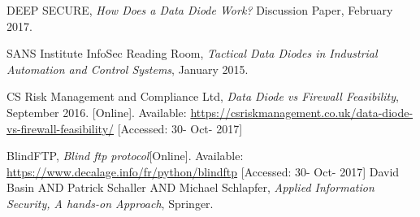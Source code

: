 \documentclass[a4paper,10pt]{article}
\begin{document}
\clearpage
\begin{thebibliography}{9}
DEEP SECURE,
\textit{How	Does a Data Diode Work?}
Discussion Paper, February 2017.

SANS Institute InfoSec Reading Room,
\textit{Tactical Data Diodes in Industrial Automation and Control Systems}, January 2015.

CS Risk Management and Compliance Ltd,
\textit{Data Diode vs Firewall Feasibility}, September 2016. [Online]. Available: \url{https://csriskmanagement.co.uk/data-diode-vs-firewall-feasibility/} [Accessed: 30- Oct- 2017]

BlindFTP,
\textit{Blind ftp protocol}[Online]. Available: \url{https://www.decalage.info/fr/python/blindftp} [Accessed: 30- Oct- 2017]
David Basin AND Patrick Schaller AND Michael Schlapfer,
\textit{Applied Information Security, A hands-on Approach},
Springer.
\end{thebibliography}
\end{document}
